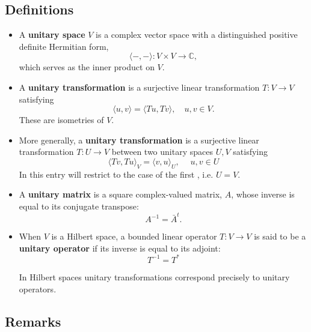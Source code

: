 \documentclass{article}
\newcommand{\cnums}{\mathbb{C}}
\begin{document}
\subsection{Definitions}
\begin{itemize}
\item A {\bf unitary space} $V$ is a complex vector space with a
distinguished positive definite Hermitian form,
$$
\langle -,-\rangle: V\times V \rightarrow \cnums,$$
which serves as
the inner product on $V$.  
\end{itemize}
\begin{itemize}
\item A {\bf unitary transformation} is a surjective linear transformation
$T:V\rightarrow V$ satisfying
\begin{equation}
  \label{eq:def}
\langle u,v \rangle = \langle Tu,Tv\rangle,\quad  u, v \in V.  
\end{equation}
These are isometries of $V$.
\end{itemize}
\begin{itemize}
\item More generally, a {\bf unitary transformation} is a surjective linear transformation $T:U \longrightarrow V$ between two unitary spaces $U,V$ satisfying
\begin{displaymath}
\langle Tv , Tu \rangle_{V} = \langle v , u \rangle_{U},\quad\; u,v \in U
\end{displaymath}
In this entry will restrict to the case of the first , i.e. $U = V$.
\end{itemize}
\begin{itemize}
\item A {\bf unitary matrix} is a square complex-valued matrix, $A$, whose inverse 
is equal to its conjugate transpose:
$$A^{-1}=\bar{A}^t.$$
\end{itemize}
\begin{itemize}
\item When $V$ is a Hilbert space, a bounded linear operator $T:V \longrightarrow V$ is said to be a {\bf unitary operator} if its inverse is equal to its adjoint:
\begin{displaymath}
T^{-1} = T^*
\end{displaymath}

In Hilbert spaces unitary transformations correspond precisely to unitary operators.
\end{itemize}

\subsection{Remarks}
\end{document}
